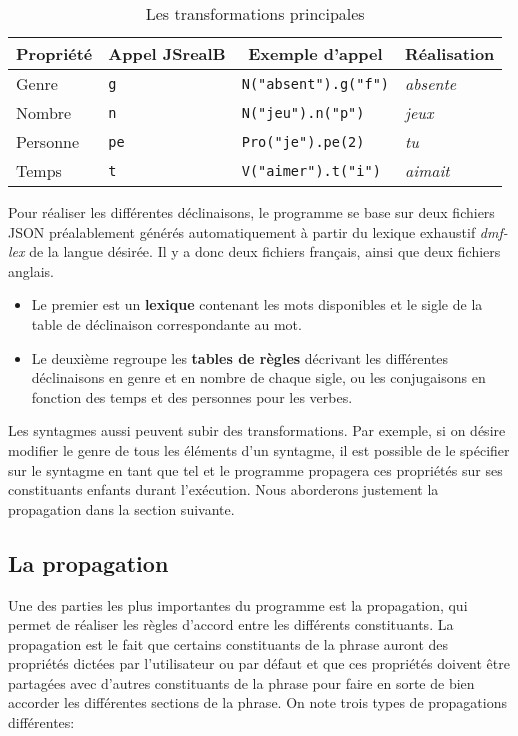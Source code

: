 \documentclass[11pt]{article} %
\newcommand{\system}[1]{\textsf{#1}}
\newcommand{\JSB}{\system{JSrealB}}
\newcommand{\real}[1]{\emph{#1}}
\begin{document}
\begin{table}[ht]
\centering
\caption{Les transformations principales}
\label{tab:transfoTable}
\begin{tabular}{|l|l|l|l|}
\hline 
\multicolumn{1}{|c}{Propriété} & \multicolumn{1}{|c}{Appel \JSB{}} & \multicolumn{1}{|c}{Exemple d'appel} & \multicolumn{1}{|c|}{Réalisation} \\
\hline 
\hline 
Genre & \texttt{g} & \texttt{N("absent").g("f")} & \real{absente}\\
\hline 
Nombre & \texttt{n} & \texttt{N("jeu").n("p")} & \real{jeux}\\
\hline 
Personne & \texttt{pe} & \texttt{Pro("je").pe(2)} & \real{tu}\\
\hline 
Temps & \texttt{t} & \texttt{V("aimer").t("i")} & \real{aimait}\\
\hline 
\end{tabular}
\end{table}


Pour réaliser les différentes déclinaisons, le programme se base sur
deux fichiers JSON préalablement générés automatiquement à partir du 
lexique exhaustif \emph{dmf-lex} de la langue désirée. Il y a donc deux fichiers 
français, ainsi que deux fichiers anglais. 
\begin{itemize}
\item Le premier
est un \textbf{lexique} contenant les mots disponibles et le sigle de la table
de déclinaison correspondante au mot. 
\item Le deuxième regroupe les \textbf{tables
de règles} décrivant les différentes déclinaisons en genre et en nombre
de chaque sigle, ou les conjugaisons en fonction des temps et des
personnes pour les verbes.
\end{itemize}

Les syntagmes aussi peuvent subir des transformations. Par exemple,
si on désire modifier le genre de tous les éléments d'un syntagme,
il est possible de le spécifier sur le syntagme en tant que tel et
le programme propagera ces propriétés sur ses constituants enfants
durant l'exécution. Nous aborderons justement la propagation dans
la section suivante.

\subsection{La propagation}

Une des parties les plus importantes du programme est la propagation,
qui permet de réaliser les règles d'accord entre les différents constituants.
La propagation est le fait que certains constituants de la phrase
auront des propriétés dictées par l'utilisateur ou par défaut et que
ces propriétés doivent être partagées avec d'autres constituants de
la phrase pour faire en sorte de bien accorder les différentes sections
de la phrase. On note trois types de propagations différentes:
\end{document}
